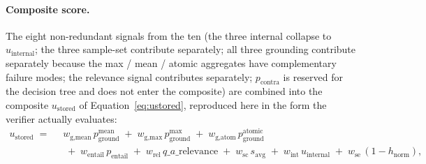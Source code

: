 \paragraph{Composite score.}
The eight non-redundant signals from the ten (the three internal collapse to $u_{\text{internal}}$; the three sample-set contribute separately; all three grounding contribute separately because the max / mean / atomic aggregates have complementary failure modes; the relevance signal contributes separately; $p_{\text{contra}}$ is reserved for the decision tree and does not enter the composite) are combined into the composite $u_{\text{stored}}$ of Equation~\ref{eq:ustored}, reproduced here in the form the verifier actually evaluates:
\begin{equation}
\begin{aligned}
u_{\text{stored}} \;=\;\;&
 w_{\text{g,mean}}\,p_{\text{ground}}^{\text{mean}}
\;+\; w_{\text{g,max}}\,p_{\text{ground}}^{\max}
\;+\; w_{\text{g,atom}}\,p_{\text{ground}}^{\text{atomic}} \\ &
\;+\; w_{\text{entail}}\,p_{\text{entail}}
\;+\; w_{\text{rel}}\,q\_a\_\text{relevance}
\;+\; w_{\text{sc}}\,s_{\text{avg}}
\;+\; w_{\text{int}}\,u_{\text{internal}}
\;+\; w_{\text{se}}\,(1 - h_{\text{norm}}),
\end{aligned}
\label{eq:ustored-verify}
\end{equation}
